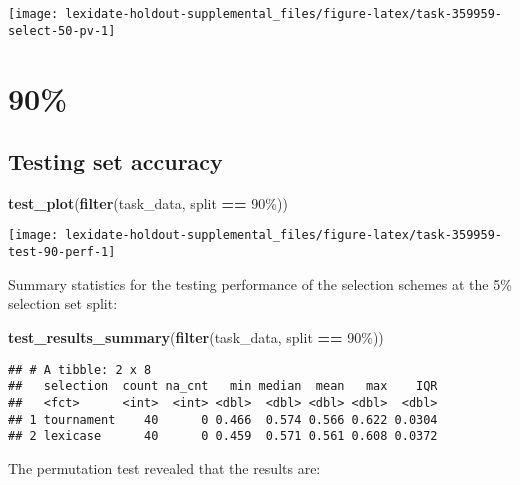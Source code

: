 \documentclass[
]{book}
\newenvironment{Shaded}{\begin{snugshade}}{\end{snugshade}}
\newcommand{\FunctionTok}[1]{\textcolor[rgb]{0.13,0.29,0.53}{\textbf{#1}}}
\newcommand{\NormalTok}[1]{#1}
\newcommand{\SpecialCharTok}[1]{\textcolor[rgb]{0.81,0.36,0.00}{\textbf{#1}}}
\newcommand{\StringTok}[1]{\textcolor[rgb]{0.31,0.60,0.02}{#1}}
\begin{document}
\texttt{[image: lexidate-holdout-supplemental\_files/figure-latex/task-359959-select-50-pv-1]}

\hypertarget{section-38}{%
\section{90\%}\label{section-38}}

\hypertarget{testing-set-accuracy-38}{%
\subsection{Testing set accuracy}\label{testing-set-accuracy-38}}

\begin{Shaded}
\begin{Highlighting}[]
\FunctionTok{test\_plot}\NormalTok{(}\FunctionTok{filter}\NormalTok{(task\_data, split }\SpecialCharTok{==} \StringTok{\textquotesingle{}90\%\textquotesingle{}}\NormalTok{))}
\end{Highlighting}
\end{Shaded}

\texttt{[image: lexidate-holdout-supplemental\_files/figure-latex/task-359959-test-90-perf-1]}

Summary statistics for the testing performance of the selection schemes at the 5\% selection set split:

\begin{Shaded}
\begin{Highlighting}[]
\FunctionTok{test\_results\_summary}\NormalTok{(}\FunctionTok{filter}\NormalTok{(task\_data, split }\SpecialCharTok{==} \StringTok{\textquotesingle{}90\%\textquotesingle{}}\NormalTok{))}
\end{Highlighting}
\end{Shaded}

\begin{verbatim}
## # A tibble: 2 x 8
##   selection  count na_cnt   min median  mean   max    IQR
##   <fct>      <int>  <int> <dbl>  <dbl> <dbl> <dbl>  <dbl>
## 1 tournament    40      0 0.466  0.574 0.566 0.622 0.0304
## 2 lexicase      40      0 0.459  0.571 0.561 0.608 0.0372
\end{verbatim}

The permutation test revealed that the results are:
\end{document}
